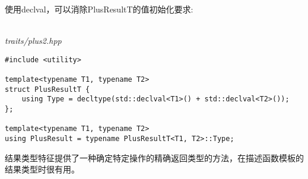 使用declval，可以消除PlusResultT的值初始化要求:

\hspace*{\fill} \\ %
\noindent
\textit{traits/plus2.hpp}
\begin{lstlisting}[style=styleCXX]
#include <utility>

template<typename T1, typename T2>
struct PlusResultT {
	using Type = decltype(std::declval<T1>() + std::declval<T2>());
};

template<typename T1, typename T2>
using PlusResult = typename PlusResultT<T1, T2>::Type;
\end{lstlisting}

结果类型特征提供了一种确定特定操作的精确返回类型的方法，在描述函数模板的结果类型时很有用。




















